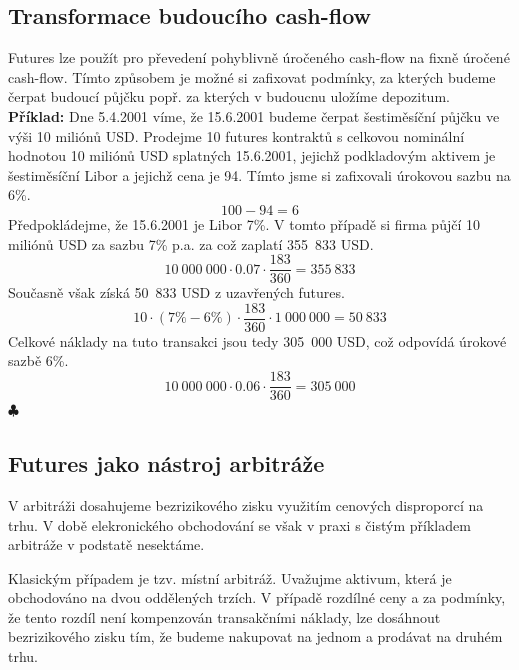 \documentclass[a4paper]{book}
\begin{document}
\subsection{Transformace budoucího cash-flow}

Futures lze použít pro převedení pohyblivně úročeného cash-flow na fixně úročené cash-flow. Tímto způsobem je možné si zafixovat podmínky, za kterých budeme čerpat budoucí půjčku popř. za kterých v budoucnu uložíme depozitum.\\

\noindent \textbf{Příklad:} Dne 5.4.2001 víme, že 15.6.2001 budeme čerpat šestiměsíční půjčku ve výši 10 miliónů USD. Prodejme 10 futures kontraktů s celkovou nominální hodnotou 10 miliónů USD splatných 15.6.2001, jejichž podkladovým aktivem je šestiměsíční Libor a jejichž cena je 94. Tímto jsme si zafixovali úrokovou sazbu na 6\%.
\begin{equation*}
100 - 94 = 6
\end{equation*}
Předpokládejme, že 15.6.2001 je Libor 7\%. V tomto případě si firma půjčí 10 miliónů USD za sazbu 7\% p.a. za což zaplatí 355~833 USD.
\begin{equation*}
10~000~000 \cdot 0.07 \cdot \frac{183}{360} = 355~833
\end{equation*}
Současně však získá 50~833 USD z uzavřených futures. 
\begin{equation*}
10 \cdot (7\% - 6\%) \cdot \frac{183}{360} \cdot 1~000~000 = 50~833
\end{equation*}
Celkové náklady na tuto transakci jsou tedy 305~000 USD, což odpovídá úrokové sazbě 6\%.
\begin{equation*}
10~000~000 \cdot 0.06 \cdot \frac{183}{360} = 305~000
\end{equation*}
$\clubsuit$

\subsection{Futures jako nástroj arbitráže}

V arbitráži dosahujeme bezrizikového zisku využitím cenových disproporcí na trhu. V době elekronického obchodování se však v praxi s čistým příkladem arbitráže v podstatě nesektáme.

Klasickým případem je tzv. místní arbitráž. Uvažujme aktivum, která je obchodováno na dvou oddělených trzích. V případě rozdílné ceny a za podmínky, že tento rozdíl není kompenzován transakčními náklady, lze dosáhnout bezrizikového zisku tím, že budeme nakupovat na jednom a prodávat na druhém trhu.
\end{document}

